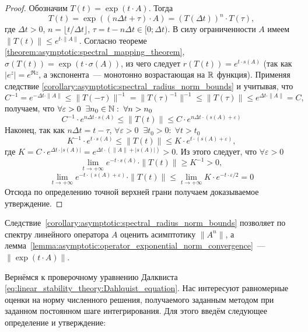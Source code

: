 \begin{proof}
    Обозначим $ T(t) = \exp(t \cdot A) $.
    Тогда
    \[
        T(t) = \exp((n \Delta t + \tau) \cdot A) = \left( T(\Delta t) \right)^n \cdot T(\tau),
    \]
    где $ \Delta t > 0 $, $ n = \lfloor t / \Delta t \rfloor $, $ \tau = t - n \Delta t \in [0;\Delta t) $.
    В силу ограниченности $ A $ имеем $ \| T(t) \| \leqslant e^{t \cdot \| A \|} $.
    Согласно теореме \ref{theorem:asymptotic:spectral_mapping_theorem}, $ \sigma(T(t)) = \exp(t \cdot \sigma(A)) $,
    из чего следует $ r(T(t)) = e^{t \cdot s(A)} $
    (так как $ \left| e^z \right| = e^{\Re z} $, а экспонента~--- монотонно возрастающая на $ \mathbb{R} $ функция).
    Применяя следствие \ref{corollary:asymptotic:spectral_radius_norm_bounds} и учитывая, что
    \[
        C^{-1} = e^{-\Delta t \cdot \| A \|} \leqslant \| T(-\tau) \|^{-1} = \| T(\tau)^{-1} \|^{-1} \leqslant \| T(\tau) \| \leqslant e^{\Delta t \cdot \| A \|} = C,
    \]
    получаем, что $ \forall \varepsilon > 0 \;\; \exists n_0 \in \mathbb{N}: \; \forall n > n_0 $
    \[
        C^{-1} \cdot e^{n \Delta t \cdot s(A)} \leqslant \| T(t) \| \leqslant C \cdot e^{n \Delta t \cdot (s(A) + \varepsilon)}
    \]
    Наконец, так как $ n \Delta t = t - \tau $, $ \forall \varepsilon > 0 \;\; \exists t_0 > 0: \; \forall t > t_0 $
    \[
        K^{-1} \cdot e^{t \cdot s(A)} \leqslant \| T(t) \| \leqslant K \cdot e^{t \cdot (s(A) + \varepsilon)},
    \]
    где $ K = C \cdot e^{\Delta t \cdot |s(A)|} = e^{\Delta t \cdot (\|A\| + |s(A)|)} > 0 $. %
    Из этого следует, что $ \forall \varepsilon > 0 $
    \[
        \lim_{t \to +\infty} e^{-t \cdot s(A)} \cdot \| T(t) \| \geqslant K^{-1} > 0,
    \]
    \[
        \lim_{t \to +\infty} e^{-t \cdot (s(A) + \varepsilon)} \cdot \| T(t) \| \leqslant \lim_{t \to +\infty} K \cdot e^{-t \cdot \varepsilon / 2} = 0
    \]
    Отсюда по определению точной верхней грани получаем доказываемое утверждение.
\end{proof}

Следствие~\ref{corollary:asymptotic:spectral_radius_norm_bounds}
позволяет по спектру линейного оператора $ A $ оценить асимптотику $ \| A^n \| $,
а лемма~\ref{lemma:asymptotic:operator_exponential_norm_convergence}~--- $ \| \exp(t \cdot A) \| $.

Вернёмся к проверочному уравнению Далквиста \eqref{eq:linear_stability_theory:Dahlquist_equation}.
Нас интересуют равномерные оценки на норму численного решения, получаемого заданным методом при заданном постоянном шаге интегрирования.
Для этого введём следующее определение и утверждение:

